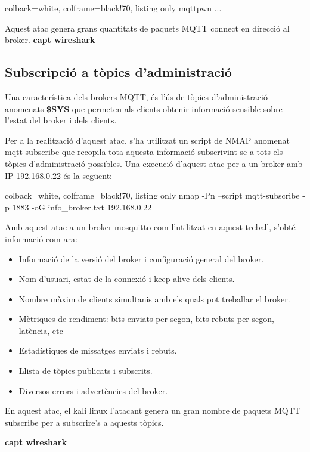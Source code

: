 \begin{tcblisting}{colback=white, colframe=black!70, listing only}
mqttpwn ...
\end{tcblisting}

Aquest atac genera grans quantitats de paquets MQTT connect en direcció al broker. 
\textbf{capt wireshark}


\subsection{Subscripció a tòpics d'administració}

Una característica dels brokers MQTT, és l'ús de tòpics d'administració anomenats \textbf{\$SYS} que permeten als clients obtenir informació sensible sobre l'estat del broker i dels clients.

Per a la realització d'aquest atac, s'ha utilitzat un script de NMAP anomenat mqtt-subscribe que recopila tota aquesta informació subscrivint-se a tots els tòpics d'administració possibles. 
Una execució d'aquest atac per a un broker amb IP 192.168.0.22 és la següent:

\begin{tcblisting}{colback=white, colframe=black!70, listing only}
    nmap -Pn --script mqtt-subscribe -p 1883 -oG info_broker.txt 192.168.0.22
\end{tcblisting}

Amb aquest atac a un broker mosquitto com l'utilitzat en aquest treball, s'obté informació com ara:

\begin{itemize}
    \item Informació de la versió del broker i configuració general del broker.
    \item Nom d'usuari, estat de la connexió i keep alive dels clients.
    \item Nombre màxim de clients simultanis amb els quals pot treballar el broker.
    \item Mètriques de rendiment: bits enviats per segon, bits rebuts per segon, latència, etc
    \item Estadístiques de missatges enviats i rebuts.
    \item Llista de tòpics publicats i subscrits.
    \item Diversos errors i advertències del broker.
\end{itemize}

En aquest atac, el kali linux l'atacant genera un gran nombre de paquets MQTT subscribe per a subscrire's a aquests tòpics. 

\textbf{capt wireshark}



